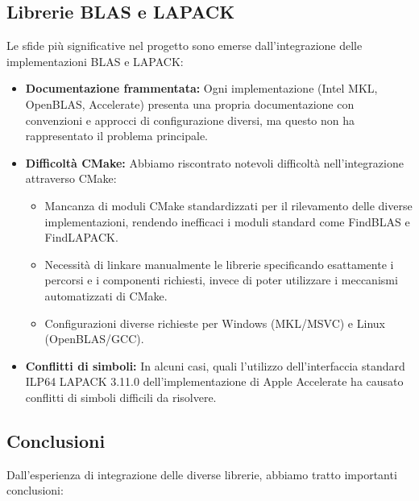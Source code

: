\subsection{Librerie BLAS e LAPACK}

Le sfide più significative nel progetto sono emerse dall'integrazione delle implementazioni BLAS e LAPACK:

\begin{itemize}
    \item \textbf{Documentazione frammentata:} Ogni implementazione (Intel MKL, OpenBLAS, Accelerate) presenta una propria documentazione con convenzioni e approcci di configurazione diversi, ma questo non ha rappresentato il problema principale.
    
    \item \textbf{Difficoltà CMake:} Abbiamo riscontrato notevoli difficoltà nell'integrazione attraverso CMake:
    \begin{itemize}
        \item Mancanza di moduli CMake standardizzati per il rilevamento delle diverse implementazioni, rendendo inefficaci i moduli standard come FindBLAS e FindLAPACK.
        \item Necessità di linkare manualmente le librerie specificando esattamente i percorsi e i componenti richiesti, invece di poter utilizzare i meccanismi automatizzati di CMake.
        \item Configurazioni diverse richieste per Windows (MKL/MSVC) e Linux (OpenBLAS/GCC).
    \end{itemize}
    
    \item \textbf{Conflitti di simboli:} In alcuni casi, quali l'utilizzo dell'interfaccia standard ILP64 LAPACK 3.11.0 dell'implementazione di Apple Accelerate ha causato conflitti di simboli difficili da risolvere.
\end{itemize}

\subsection{Conclusioni}

Dall'esperienza di integrazione delle diverse librerie, abbiamo tratto importanti conclusioni:

